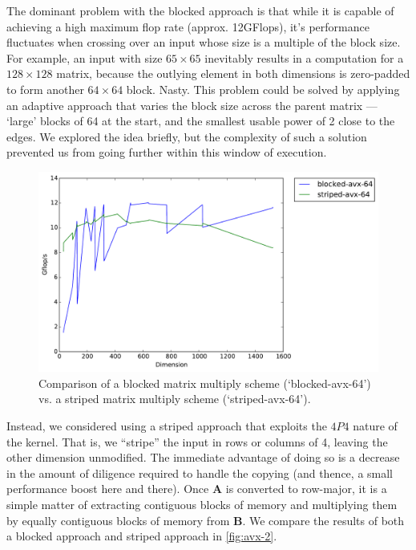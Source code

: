 \documentclass{scrartcl}
\begin{document}
  The dominant problem with the blocked approach is that while it is capable of achieving a high maximum flop rate (approx. 12GFlops), it's performance fluctuates when crossing over an input whose size is a multiple of the block size. For example, an input with size $65 \times 65$ inevitably results in a computation for a $128 \times 128$ matrix, because the outlying element in both dimensions is zero-padded to form another $64 \times 64$ block. Nasty. This problem could be solved by applying an adaptive approach that varies the block size across the parent matrix --- `large' blocks of 64 at the start, and the smallest usable power of 2 close to the edges. We explored the idea briefly, but the complexity of such a solution prevented us from going further within this window of execution.

  \begin{figure}[ht!]
    \centering
    \includegraphics[width=\textwidth]{timing-blocked-vs-striped}
    \caption{Comparison of a blocked matrix multiply scheme (`blocked-avx-64') vs. a striped matrix multiply scheme (`striped-avx-64').\label{fig:avx-2}}
  \end{figure}

  Instead, we considered using a striped approach that exploits the $4P4$ nature of the kernel. That is, we ``stripe'' the input in rows or columns of 4, leaving the other dimension unmodified.  The immediate advantage of doing so is a decrease in the amount of diligence required to handle the copying (and thence, a small performance boost here and there). Once $\mathbf{A}$ is converted to row-major, it is a simple matter of extracting contiguous blocks of memory and multiplying them by equally contiguous blocks of memory from $\mathbf{B}$. We compare the results of both a blocked approach and striped approach in \autoref{fig:avx-2}.
\end{document}
